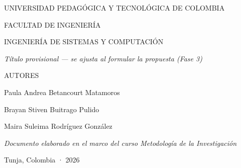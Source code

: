 \begin{titlepage}
\centering
\vspace*{1cm}
{\large UNIVERSIDAD PEDAGÓGICA Y TECNOLÓGICA DE COLOMBIA\par}
{\large FACULTAD DE INGENIERÍA\par}
{\large INGENIERÍA DE SISTEMAS Y COMPUTACIÓN\par}

\vspace{3cm}
{\LARGE\bfseries \tituloProvisional \par}

\vspace{0.5cm}
{\itshape Título provisional --- se ajusta al formular la propuesta (Fase 3)\par}

\vspace{3cm}
{\large AUTORES\par}
\vspace{0.5cm}
{\large Paula Andrea Betancourt Matamoros\par}
{\large Brayan Stiven Buitrago Pulido\par}
{\large Maira Suleima Rodríguez González\par}

\vfill
{\itshape Documento elaborado en el marco del curso Metodología de la Investigación\par}
\vspace{0.5cm}
{Tunja, Colombia · 2026\par}
\end{titlepage}